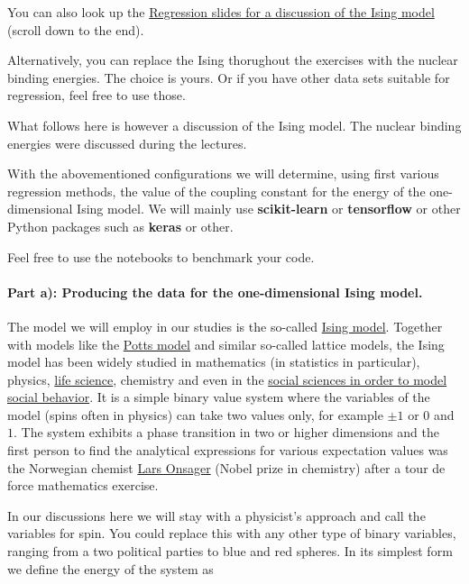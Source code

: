 \documentclass[%
oneside,                 %
final,                   %
10pt]{article}
\begin{document}
You can also look up the \href{{https://compphysics.github.io/MachineLearningMSU-FRIB2020/doc/pub/Regression/html/Regression.html}}{Regression slides for a discussion of the Ising model} (scroll down to the end).

Alternatively, you can replace the Ising thorughout the exercises with the nuclear binding energies. The choice is yours. Or if you have other data sets suitable for regression, feel free to use those.


What follows here is however a discussion of the Ising model. The nuclear binding energies were discussed during the lectures.

With the abovementioned configurations we will determine, using first
various regression methods, the value of the coupling constant for the
energy of the one-dimensional Ising model.
We will mainly use \textbf{scikit-learn} or \textbf{tensorflow} or other Python packages such as \textbf{keras} or other.

Feel free to use the notebooks to benchmark your code.  


\paragraph{Part a): Producing the data for the one-dimensional Ising model.}
The model we will employ in our studies is the so-called \href{{https://en.wikipedia.org/wiki/Ising_model}}{Ising
model}.  Together with
models like the \href{{https://en.wikipedia.org/wiki/Potts_model}}{Potts
model} and similar
so-called lattice models, the Ising model has been widely studied in
mathematics (in statistics in particular), physics, \href{{https://journals.aps.org/pre/abstract/10.1103/PhysRevE.93.062402}}{life
science},
chemistry and even in the \href{{https://www.springer.com/gp/book/9781461420316}}{social sciences in order to model social
behavior}. It is a
simple binary value system where the variables of the model (spins often in
physics) can take two values only, for example $\pm 1$ or $0$ and $1$.
The system exhibits a phase transition in two or higher dimensions and
the first person to find the analytical expressions for various
expectation values was the Norwegian chemist \href{{https://en.wikipedia.org/wiki/Lars_Onsager}}{Lars
Onsager} (Nobel prize in
chemistry) after a tour de force mathematics exercise.

In our discussions here we will stay with a physicist's approach and
call the variables for spin. You could replace this with any other
type of binary variables, ranging from a two political parties to blue
and red spheres.  In its simplest form we define the energy of the
system as
\end{document}
